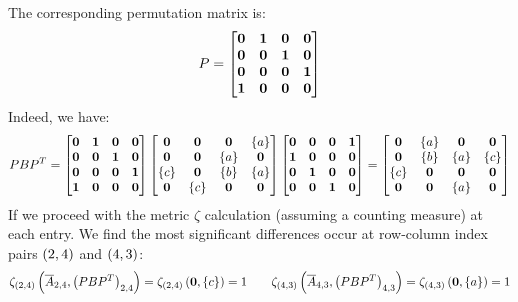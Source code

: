 \begin{example}
  The corresponding permutation matrix is:
  \begin{align*}
    P =
      \begin{bmatrix}
        \mathbf{0} & \mathbf{1} & \mathbf{0} & \mathbf{0} \\
        \mathbf{0} & \mathbf{0} & \mathbf{1} & \mathbf{0} \\
        \mathbf{0} & \mathbf{0} & \mathbf{0} & \mathbf{1} \\
        \mathbf{1} & \mathbf{0} & \mathbf{0} & \mathbf{0}
      \end{bmatrix}
  \end{align*}
  Indeed, we have:
  \begin{align*}
    PB{P}^T
    =
      \begin{bmatrix}
        \mathbf{0} & \mathbf{1} & \mathbf{0} & \mathbf{0} \\
        \mathbf{0} & \mathbf{0} & \mathbf{1} & \mathbf{0} \\
        \mathbf{0} & \mathbf{0} & \mathbf{0} & \mathbf{1} \\
        \mathbf{1} & \mathbf{0} & \mathbf{0} & \mathbf{0}
      \end{bmatrix}
      \begin{bmatrix}
        \mathbf{0} & \mathbf{0} & \mathbf{0} & \left\{a\right\} \\
        \mathbf{0} & \mathbf{0} & \left\{a\right\} & \mathbf{0} \\
        \left\{c\right\} & \mathbf{0} & \left\{b\right\} & \left\{a\right\} \\
        \mathbf{0} & \left\{c\right\} & \mathbf{0} & \mathbf{0}
      \end{bmatrix}
      \begin{bmatrix}
        \mathbf{0} & \mathbf{0} & \mathbf{0} & \mathbf{1} \\
        \mathbf{1} & \mathbf{0} & \mathbf{0} & \mathbf{0} \\
        \mathbf{0} & \mathbf{1} & \mathbf{0} & \mathbf{0} \\
        \mathbf{0} & \mathbf{0} & \mathbf{1} & \mathbf{0}
      \end{bmatrix}
    =
      \begin{bmatrix}
        \mathbf{0} & \left\{a\right\} & \mathbf{0} & \mathbf{0} \\
        \mathbf{0} & \left\{b\right\} & \left\{a\right\} & \left\{c\right\} \\
        \left\{c\right\} & \mathbf{0} & \mathbf{0} & \mathbf{0} \\
        \mathbf{0} & \mathbf{0} & \left\{a\right\} & \mathbf{0}
      \end{bmatrix}
  \end{align*}
  If we proceed with the metric \(\zeta\) calculation
  (assuming a counting measure) at each entry.
  We find the most significant differences occur
  at row-column index pairs \(\left(2, 4\right)\) and \(\left(4, 3\right)\):
  \begin{align*}
    \zeta_{\left(2, 4\right)}\left(\overline{A}_{2, 4},
           \left(PB{P^T}\right)_{2, 4}\right)
      = \zeta_{\left(2, 4\right)}\left(\mathbf{0}, \left\{c\right\}\right) = 1
    \qquad
    \zeta_{\left(4, 3\right)} \left(\overline{A}_{4, 3},
           \left(PB{P^T}\right)_{4, 3}\right)
      = \zeta_{\left(4, 3\right)}\left(\mathbf{0}, \left\{a\right\}\right) = 1
  \end{align*}

\end{example}

